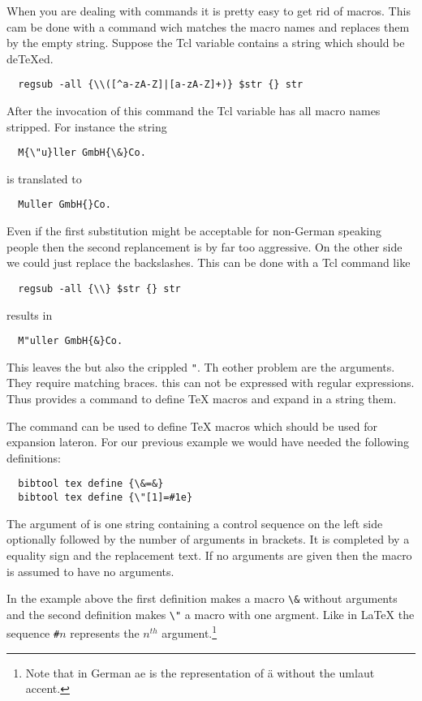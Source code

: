 When you are dealing with \LaTeXTeX{} commands it is pretty easy to
get rid of macros. This cam be done with a  command wich
matches the macro names and replaces them by the empty string. Suppose
the Tcl variable  contains a string which should be
de\TeX{}ed. 
\begin{verbatim}
  regsub -all {\\([^a-zA-Z]|[a-zA-Z]+)} $str {} str
\end{verbatim}%
After the invocation of this command the Tcl variable 
has all macro names stripped. For instance the string
\begin{verbatim}
  M{\"u}ller GmbH{\&}Co.
\end{verbatim}
\noindent is translated to
\begin{verbatim}
  Muller GmbH{}Co.
\end{verbatim}
Even if the first substitution might be acceptable for non-German
speaking people then the second replancement is by far too aggressive.
On the other side we could just replace the backslashes. This can be
done with a Tcl command like
\begin{verbatim}
  regsub -all {\\} $str {} str
\end{verbatim}%
\noindent results in
\begin{verbatim}
  M"uller GmbH{&}Co.
\end{verbatim}
This leaves the \code{\&} but also the crippled \verb|"|. Th eother
problem are the arguments. They require matching braces. this can not
be expressed with regular expressions. Thus \BibTool{} provides a
command to define \TeX{} macros and expand in a string them.

The command  can be used to define \TeX{} macros
which should be used for expansion lateron. For our previous example
we would have needed the following definitions:
\begin{verbatim}
  bibtool tex define {\&=&}
  bibtool tex define {\"[1]=#1e}
\end{verbatim}
The argument of  is one string containing a
control sequence on the left side optionally followed by the number of
arguments in brackets. It is completed by a equality sign and the
replacement text. If no arguments are given then the macro is assumed
to have no arguments.

In the example above the first definition makes a macro \verb|\&|
without arguments and the second definition makes \verb|\"| a macro
with one argment. Like in \LaTeX{} the sequence \verb|#|$n$ represents
the $n^{th}$ argument.\footnote{Note that in German ae is the
  representation of \"a without the umlaut accent.}

